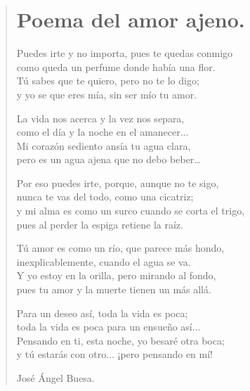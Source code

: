 \documentclass[11pt, portrait, twoside, notitlepage, openright]{book}
\begin{document}
\newpage
\begin{verse}
\begin{center}
\section{Poema del amor ajeno.}
\end{center}
Puedes irte y no importa, pues te quedas conmigo\\
como queda un perfume donde había una flor.\\
Tú sabes que te quiero, pero no te lo digo;\\
y yo se que eres mía, sin ser mío tu amor.
\newline

La vida nos acerca y la vez nos separa,\\
como el día y la noche en el amanecer...\\
Mi corazón sediento ansía tu agua clara,\\
pero es un agua ajena que no debo beber…
\newline

Por eso puedes irte, porque, aunque no te sigo,\\
nunca te vas del todo, como una cicatriz;\\
y mi alma es como un surco cuando se corta el trigo,\\
pues al perder la espiga retiene la raíz.
\newline

Tú amor es como un río, que parece más hondo,\\
inexplicablemente, cuando el agua se va.\\
Y yo estoy en la orilla, pero mirando al fondo,\\
pues tu amor y la muerte tienen un más allá.
\newpage

Para un deseo así, toda la vida es poca;\\
toda la vida es poca para un ensueño así...\\
Pensando en ti, esta noche, yo besaré otra boca;\\
y tú estarás con otro... ¡pero pensando en mí!
\newline

José Ángel Buesa.
\end{verse}
\end{document}

